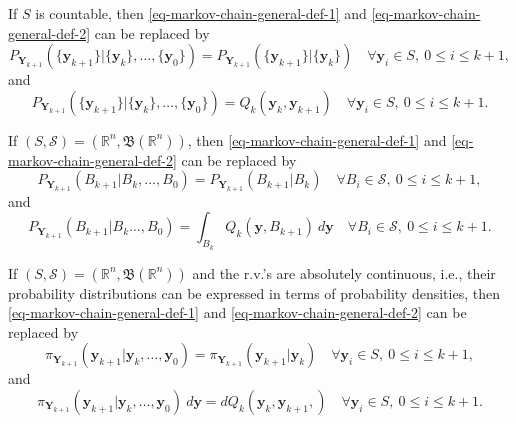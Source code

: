 If $S$ is countable, then \eqref{eq-markov-chain-general-def-1} and \eqref{eq-markov-chain-general-def-2} can be replaced by
\begin{equation}\label{eq-markov-chain-countable-def-1}
P_{\mathbf{Y}_{k+1}}(
\{\mathbf{y}_{k+1}\}
|
\{\mathbf{y}_k\},
\ldots,
\{\mathbf{y}_0\}
)
=
P_{\mathbf{Y}_{k+1}}(
\{\mathbf{y}_{k+1}\}
|
\{\mathbf{y}_k\}
)
\quad\forall
\mathbf{y}_i\in S,~0\leqslant i\leqslant k+1,
\end{equation}
and
\begin{equation}\label{eq-markov-chain-countable-def-2}
P_{\mathbf{Y}_{k+1}}(
\{\mathbf{y}_{k+1}\}
|
\{\mathbf{y}_k\},
\ldots,
\{\mathbf{y}_0\}
)
=
Q_k(
\mathbf{y}_k,
\mathbf{y}_{k+1}
)
\quad\forall
\mathbf{y}_i\in S,~0\leqslant i\leqslant k+1.
\end{equation}

If $(S,\mathcal{S})=(\mathbb{R}^n,\mathfrak{B}(\mathbb{R}^n))$, then \eqref{eq-markov-chain-general-def-1} and \eqref{eq-markov-chain-general-def-2} can be replaced by
\begin{equation}\label{eq-markov-chain-R-def-1}
P_{\mathbf{Y}_{k+1}}(
B_{k+1}
|
B_k,
\ldots,
B_0
)
=
P_{\mathbf{Y}_{k+1}}(
B_{k+1}
|
B_k
)
\quad\forall
B_i\in\mathcal{S},~0\leqslant i\leqslant k+1,
\end{equation}
and
\begin{equation}\label{eq-markov-chain-R-def-2}
P_{\mathbf{Y}_{k+1}}(
B_{k+1}|
B_k
\ldots,
B_0
)
=
\int_{B_k} Q_k(
\mathbf{y},B_{k+1}
)~d\mathbf{y}
\quad\forall
B_i\in\mathcal{S},~0\leqslant i\leqslant k+1.
\end{equation}

If $(S,\mathcal{S})=(\mathbb{R}^n,\mathfrak{B}(\mathbb{R}^n))$ and
the r.v.'s are absolutely continuous, i.e., their probability distributions can be expressed in terms of probability densities,
then \eqref{eq-markov-chain-general-def-1} and \eqref{eq-markov-chain-general-def-2} can be replaced by
\begin{equation}\label{eq-markov-chain-Rac-def-1}
\pi_{\mathbf{Y}_{k+1}}(
\mathbf{y}_{k+1}
|
\mathbf{y}_k,
\ldots,
\mathbf{y}_0
)
=
\pi_{\mathbf{Y}_{k+1}}(
\mathbf{y}_{k+1}
|
\mathbf{y}_k
)
\quad\forall
\mathbf{y}_i\in S,~0\leqslant i\leqslant k+1,
\end{equation}
and
\begin{equation}\label{eq-markov-chain-Rac-def-2}
\pi_{\mathbf{Y}_{k+1}}(
\mathbf{y}_{k+1}
|
\mathbf{y}_k,
\ldots,
\mathbf{y}_0
)~d\mathbf{y}
=
dQ_k(
\mathbf{y}_k,
\mathbf{y}_{k+1},
)
\quad\forall
\mathbf{y}_i\in S,~0\leqslant i\leqslant k+1.
\end{equation}


